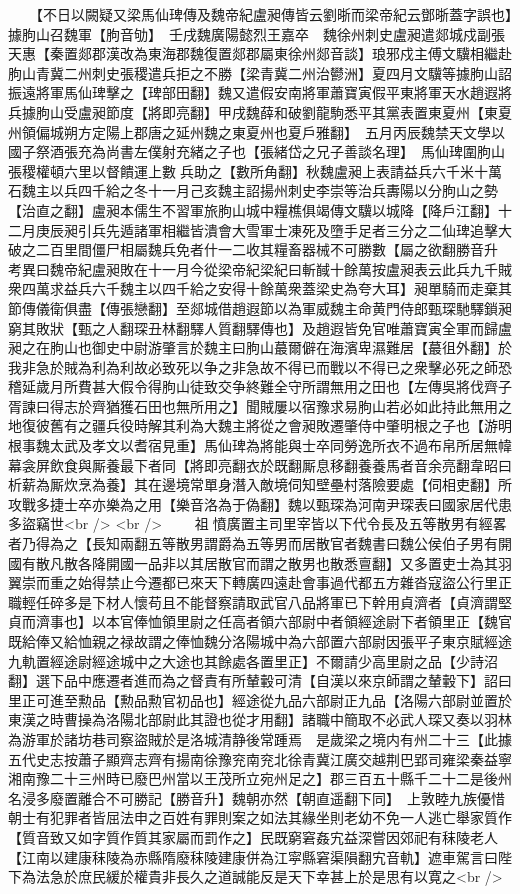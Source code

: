 　　【不日以闕疑又梁馬仙琕傳及魏帝紀盧昶傳皆云劉晣而梁帝紀云鄧晣蓋字誤也】據朐山召魏軍【朐音劬】　壬戌魏廣陽懿烈王嘉卒　魏徐州刺史盧昶遣郯城戍副張天惠【秦置郯郡漢改為東海郡魏復置郯郡屬東徐州郯音談】琅邪戍主傅文驥相繼赴朐山青冀二州刺史張稷遣兵拒之不勝【梁青冀二州治鬰洲】夏四月文驥等據朐山詔振遠將軍馬仙琕擊之【琕部田翻】魏又遣假安南將軍蕭寶寅假平東將軍天水趙遐將兵據朐山受盧昶節度【將即亮翻】甲戌魏薛和破劉龍駒悉平其黨表置東夏州【東夏州領偏城朔方定陽上郡唐之延州魏之東夏州也夏戶雅翻】　五月丙辰魏禁天文學以國子祭酒張充為尚書左僕射充緒之子也【張緒岱之兄子善談名理】　馬仙琕圍朐山張稷權頓六里以督饋運上數兵助之【數所角翻】秋魏盧昶上表請益兵六千米十萬石魏主以兵四千給之冬十一月己亥魏主詔揚州刺史李崇等治兵夀陽以分朐山之勢【治直之翻】盧昶本儒生不習軍旅朐山城中糧樵俱竭傳文驥以城降【降戶江翻】十二月庚辰昶引兵先遁諸軍相繼皆潰會大雪軍士凍死及墮手足者三分之二仙琕追擊大破之二百里間僵尸相屬魏兵免者什一二收其糧畜器械不可勝數【屬之欲翻勝音升　考異曰魏帝紀盧昶敗在十一月今從梁帝紀梁紀曰斬馘十餘萬按盧昶表云此兵九千賊衆四萬求益兵六千魏主以四千給之安得十餘萬衆蓋梁史為夸大耳】昶單騎而走棄其節傳儀衛俱盡【傳張戀翻】至郯城借趙遐節以為軍威魏主命黄門侍郎甄琛馳驛鎖昶窮其敗狀【甄之人翻琛丑林翻驛人質翻驛傳也】及趙遐皆免官唯蕭寶寅全軍而歸盧昶之在朐山也御史中尉游肇言於魏主曰朐山蕞爾僻在海濱卑濕難居【蕞徂外翻】於我非急於賊為利為利故必致死以争之非急故不得已而戰以不得已之衆擊必死之師恐稽延歲月所費甚大假令得朐山徒致交争終難全守所謂無用之田也【左傳吳將伐齊子胥諫曰得志於齊猶獲石田也無所用之】聞賊屢以宿豫求易朐山若必如此持此無用之地復彼舊有之疆兵役時解其利為大魏主將從之會昶敗遷肇侍中肇明根之子也【游明根事魏太武及孝文以耆宿見重】馬仙琕為將能與士卒同勞逸所衣不過布帛所居無幃幕衾屏飲食與厮養最下者同【將即亮翻衣於既翻厮息移翻養養馬者音余亮翻韋昭曰析薪為厮炊烹為養】其在邊境常單身潛入敵境伺知壁壘村落險要處【伺相吏翻】所攻戰多捷士卒亦樂為之用【樂音洛為于偽翻】魏以甄琛為河南尹琛表曰國家居代患多盜竊世<br />
<br />
　　祖憤廣置主司里宰皆以下代令長及五等散男有經畧者乃得為之【長知兩翻五等散男謂爵為五等男而居散官者魏書曰魏公侯伯子男有開國有散凡散各降開國一品非以其居散官而謂之散男也散悉亶翻】又多置吏士為其羽翼崇而重之始得禁止今遷都已來天下轉廣四遠赴會事過代都五方雜沓寇盜公行里正職輕任碎多是下材人懷苟且不能督察請取武官八品將軍已下幹用貞濟者【貞濟謂堅貞而濟事也】以本官俸恤領里尉之任高者領六部尉中者領經途尉下者領里正【魏官既給俸又給恤親之禄故謂之俸恤魏分洛陽城中為六部置六部尉因張平子東京賦經途九軌置經途尉經途城中之大途也其餘處各置里正】不爾請少高里尉之品【少詩沼翻】選下品中應遷者進而為之督責有所輦轂可清【自漢以來京師謂之輦轂下】詔曰里正可進至勲品【勲品勲官初品也】經途從九品六部尉正九品【洛陽六部尉並置於東漢之時曹操為洛陽北部尉此其證也從才用翻】諸職中簡取不必武人琛又奏以羽林為游軍於諸坊巷司察盜賊於是洛城清静後常踵焉　是歲梁之境内有州二十三【此據五代史志按蕭子顯齊志齊有揚南徐豫兖南兖北徐青冀江廣交越荆巴郢司雍梁秦益寧湘南豫二十三州時已廢巴州當以王茂所立宛州足之】郡三百五十縣千二十二是後州名浸多廢置離合不可勝記【勝音升】魏朝亦然【朝直遥翻下同】　上敦睦九族優惜朝士有犯罪者皆屈法申之百姓有罪則案之如法其緣坐則老幼不免一人逃亡舉家質作【質音致又如字質作質其家屬而罰作之】民既窮窘姦宄益深嘗因郊祀有秣陵老人【江南以建康秣陵為赤縣隋廢秣陵建康併為江寜縣窘渠隕翻宄音軌】遮車駕言曰陛下為法急於庶民緩於權貴非長久之道誠能反是天下幸甚上於是思有以寛之<br />

